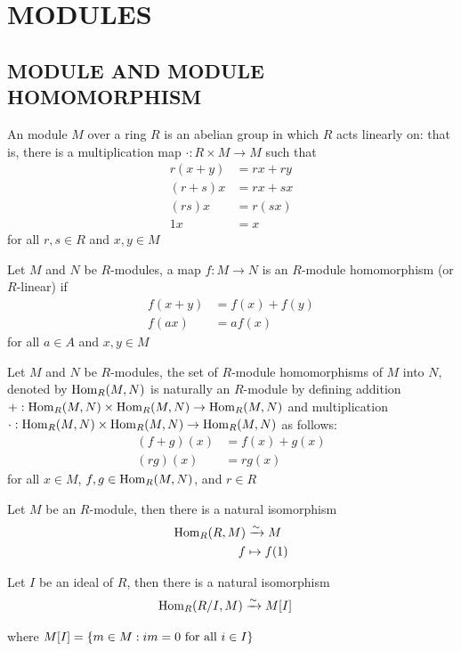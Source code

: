 \chapter{MODULES}

\section{MODULE AND MODULE HOMOMORPHISM}

\begin{definition}[module]
	An module $M$ over a ring $R$ is an abelian group in which $R$ acts linearly on: that is, there is a multiplication map $\cdot: R \times M \to M$ such that
	\begin{align*}
		r(x + y) &= rx + ry \\
		(r + s)x &= rx + sx \\
		(rs)x &= r(sx) \\
		1x &= x 
	\end{align*}
	for all $r, s \in R$ and $x, y \in M$
\end{definition}

\begin{definition}
	Let $M$ and $N$ be $R$-modules, a map $f: M \to N$ is an $R$-module homomorphism (or $R$-linear) if
	\begin{align*}
		f(x + y) &= f(x) + f(y) \\
		f(ax) &= a f(x)
	\end{align*}
	for all $a \in A$ and $x, y \in M$
\end{definition}

\begin{remark}
	Let $M$ and $N$ be $R$-modules, the set of $R$-module homomorphisms of $M$ into $N$, denoted by $\operatorname{Hom}_R(M, N)$ is naturally an $R$-module by defining addition $+: \operatorname{Hom}_R(M, N) \times \operatorname{Hom}_R(M, N) \to \operatorname{Hom}_R(M, N)$ and multiplication  $\cdot: \operatorname{Hom}_R(M, N) \times \operatorname{Hom}_R(M, N) \to \operatorname{Hom}_R(M, N)$ as follows:
	\begin{align*}
		(f + g)(x) &= f(x) + g(x) \\
		(r g)(x) &= r g(x)
	\end{align*}
	for all $x \in M$, $f, g \in \operatorname{Hom}_R(M, N)$, and $r \in R$
\end{remark}

\begin{remark}
	Let $M$ be an $R$-module, then there is a natural isomorphism
	\begin{align*}
		\operatorname{Hom}_R(R, M) &\xrightarrow{\sim} M \\
		f &\mapsto f(1)
	\end{align*}
	
	Let $I$ be an ideal of $R$, then there is a natural isomorphism
	\begin{align*}
		\operatorname{Hom}_R(R / I, M) &\xrightarrow{\sim} M[I]
	\end{align*}
	
	where $M[I] = \{m \in M: im = 0 \text{ for all } i \in I\}$
\end{remark}

